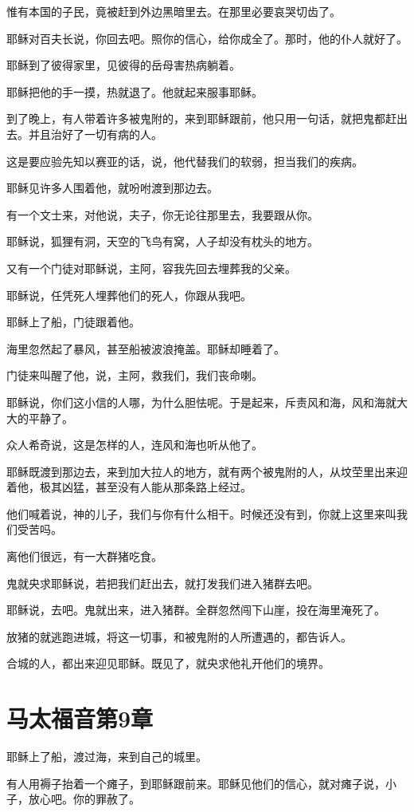 \documentclass[12pt,oneside]{book}
\begin{document}
惟有本国的子民，竟被赶到外边黑暗里去。在那里必要哀哭切齿了。

耶稣对百夫长说，你回去吧。照你的信心，给你成全了。那时，他的仆人就好了。

耶稣到了彼得家里，见彼得的岳母害热病躺着。

耶稣把他的手一摸，热就退了。他就起来服事耶稣。

到了晚上，有人带着许多被鬼附的，来到耶稣跟前，他只用一句话，就把鬼都赶出去。并且治好了一切有病的人。

这是要应验先知以赛亚的话，说，他代替我们的软弱，担当我们的疾病。

耶稣见许多人围着他，就吩咐渡到那边去。

有一个文士来，对他说，夫子，你无论往那里去，我要跟从你。

耶稣说，狐狸有洞，天空的飞鸟有窝，人子却没有枕头的地方。

又有一个门徒对耶稣说，主阿，容我先回去埋葬我的父亲。

耶稣说，任凭死人埋葬他们的死人，你跟从我吧。

耶稣上了船，门徒跟着他。

海里忽然起了暴风，甚至船被波浪掩盖。耶稣却睡着了。

门徒来叫醒了他，说，主阿，救我们，我们丧命喇。

耶稣说，你们这小信的人哪，为什么胆怯呢。于是起来，斥责风和海，风和海就大大的平静了。

众人希奇说，这是怎样的人，连风和海也听从他了。

耶稣既渡到那边去，来到加大拉人的地方，就有两个被鬼附的人，从坟茔里出来迎着他，极其凶猛，甚至没有人能从那条路上经过。

他们喊着说，神的儿子，我们与你有什么相干。时候还没有到，你就上这里来叫我们受苦吗。

离他们很远，有一大群猪吃食。

鬼就央求耶稣说，若把我们赶出去，就打发我们进入猪群去吧。

耶稣说，去吧。鬼就出来，进入猪群。全群忽然闯下山崖，投在海里淹死了。

放猪的就逃跑进城，将这一切事，和被鬼附的人所遭遇的，都告诉人。

合城的人，都出来迎见耶稣。既见了，就央求他礼开他们的境界。

\chapter{马太福音第9章}
耶稣上了船，渡过海，来到自己的城里。

有人用褥子抬着一个瘫子，到耶稣跟前来。耶稣见他们的信心，就对瘫子说，小子，放心吧。你的罪赦了。
\end{document}

